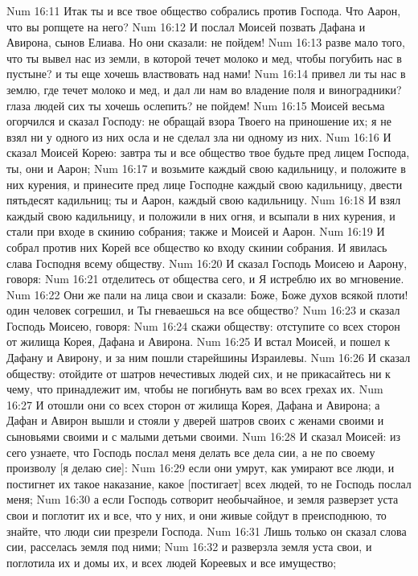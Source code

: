 Num 16:11  Итак ты и все твое общество собрались против Господа. Что Аарон, что вы ропщете на него?
Num 16:12  И послал Моисей позвать Дафана и Авирона, сынов Елиава. Но они сказали: не пойдем!
Num 16:13  разве мало того, что ты вывел нас из земли, в которой течет молоко и мед, чтобы погубить нас в пустыне? и ты еще хочешь властвовать над нами!
Num 16:14  привел ли ты нас в землю, где течет молоко и мед, и дал ли нам во владение поля и виноградники? глаза людей сих ты хочешь ослепить? не пойдем!
Num 16:15  Моисей весьма огорчился и сказал Господу: не обращай взора Твоего на приношение их; я не взял ни у одного из них осла и не сделал зла ни одному из них.
Num 16:16  И сказал Моисей Корею: завтра ты и все общество твое будьте пред лицем Господа, ты, они и Аарон;
Num 16:17  и возьмите каждый свою кадильницу, и положите в них курения, и принесите пред лице Господне каждый свою кадильницу, двести пятьдесят кадильниц; ты и Аарон, каждый свою кадильницу.
Num 16:18  И взял каждый свою кадильницу, и положили в них огня, и всыпали в них курения, и стали при входе в скинию собрания; также и Моисей и Аарон.
Num 16:19  И собрал против них Корей все общество ко входу скинии собрания. И явилась слава Господня всему обществу.
Num 16:20  И сказал Господь Моисею и Аарону, говоря:
Num 16:21  отделитесь от общества сего, и Я истреблю их во мгновение.
Num 16:22  Они же пали на лица свои и сказали: Боже, Боже духов всякой плоти! один человек согрешил, и Ты гневаешься на все общество?
Num 16:23  и сказал Господь Моисею, говоря:
Num 16:24  скажи обществу: отступите со всех сторон от жилища Корея, Дафана и Авирона.
Num 16:25  И встал Моисей, и пошел к Дафану и Авирону, и за ним пошли старейшины Израилевы.
Num 16:26  И сказал обществу: отойдите от шатров нечестивых людей сих, и не прикасайтесь ни к чему, что принадлежит им, чтобы не погибнуть вам во всех грехах их.
Num 16:27  И отошли они со всех сторон от жилища Корея, Дафана и Авирона; а Дафан и Авирон вышли и стояли у дверей шатров своих с женами своими и сыновьями своими и с малыми детьми своими.
Num 16:28  И сказал Моисей: из сего узнаете, что Господь послал меня делать все дела сии, а не по своему произволу [я делаю сие]:
Num 16:29  если они умрут, как умирают все люди, и постигнет их такое наказание, какое [постигает] всех людей, то не Господь послал меня;
Num 16:30  а если Господь сотворит необычайное, и земля разверзет уста свои и поглотит их и все, что у них, и они живые сойдут в преисподнюю, то знайте, что люди сии презрели Господа.
Num 16:31  Лишь только он сказал слова сии, расселась земля под ними;
Num 16:32  и разверзла земля уста свои, и поглотила их и домы их, и всех людей Кореевых и все имущество;
